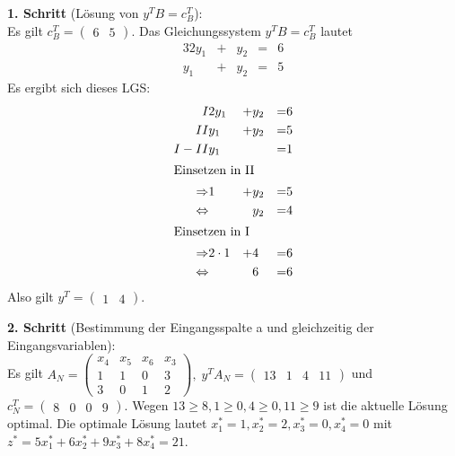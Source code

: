 \documentclass[10pt,a4paper,oneside,ngerman,numbers=noenddot]{scrartcl}
\begin{document}
		\textbf{1. Schritt} (Lösung von $y^{T}B = c_{B}^{T}$):\\
		Es gilt $c_{B}^{T} = \begin{pmatrix} 6 & 5 \end{pmatrix}$. Das Gleichungssystem $y^{T}B = c_{B}^{T}$ lautet
		\begin{alignat*}{3}
			2y_{1} &+& y_{2} &=& 6 \\
			y_{1} &+& y_{2} &=& 5
		\end{alignat*}
		Es ergibt sich dieses LGS:
		\begin{alignat*}{3}
			I & 2y_{1} &+& y_{2} &=& 6 \\
			II & y_{1} &+& y_{2} &=& 5 \\
			I - II & y_{1} && &=& 1 \\
			\intertext{Einsetzen in II}
			\Rightarrow & 1 &+& y_{2} &=& 5 \\
			\Leftrightarrow & && y_{2} &=& 4 \\
			\intertext{Einsetzen in I}
			\Rightarrow & 2 \cdot 1 &+& 4 &=& 6 \\
			\Leftrightarrow & && 6 &=& 6
		\end{alignat*}
		Also gilt $y^{T} = \begin{pmatrix} 1 & 4 \end{pmatrix}$.
		
		\textbf{2. Schritt} (Bestimmung der Eingangsspalte a und gleichzeitig der Eingangsvariablen):\\
		Es gilt $A_{N} = \begin{pmatrix} x_{4} & x_{5} & x_{6} & x_{3} \\ 1 & 1 & 0 & 3 \\ 3 & 0 & 1 & 2 \end{pmatrix},\; y^{T}A_{N} = \begin{pmatrix} 13 & 1 & 4 & 11 \end{pmatrix}$ und $c_{N}^{T} = \begin{pmatrix} 8 & 0 & 0 & 9\end{pmatrix}$.  Wegen $13 \geq 8, 1 \geq 0, 4 \geq 0, 11 \geq 9$ ist die aktuelle Lösung optimal. Die optimale Lösung lautet $x_{1}^{*} = 1, x_{2}^{*} = 2, x_{3}^{*} = 0, x_{4}^{*} = 0$ mit $z^{*} = 5x_{1}^{*} + 6x_{2}^{*} + 9x_{3}^{*} + 8x_{4}^{*} = 21$.
\end{document}
